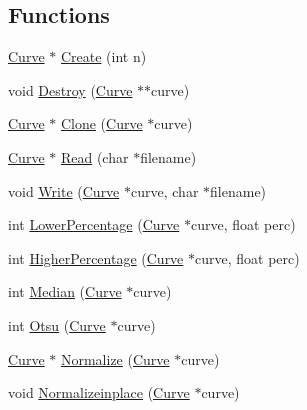 \subsection*{Functions}
\begin{DoxyCompactItemize}
\item 
\hyperlink{namespacegft_1_1Curve_acc891f63f04c17f7b2cafe7ed9ecffdb}{Curve} $\ast$ \hyperlink{namespacegft_1_1Curve_a7cf4bab7abfe8541e31da0df2573b468}{Create} (int n)
\item 
void \hyperlink{namespacegft_1_1Curve_a994c428f1902a7dddf16233227dc7ab4}{Destroy} (\hyperlink{namespacegft_1_1Curve_acc891f63f04c17f7b2cafe7ed9ecffdb}{Curve} $\ast$$\ast$curve)
\item 
\hyperlink{namespacegft_1_1Curve_acc891f63f04c17f7b2cafe7ed9ecffdb}{Curve} $\ast$ \hyperlink{namespacegft_1_1Curve_a658d7489c5c13b5acb86f1ae9a8b228c}{Clone} (\hyperlink{namespacegft_1_1Curve_acc891f63f04c17f7b2cafe7ed9ecffdb}{Curve} $\ast$curve)
\item 
\hyperlink{namespacegft_1_1Curve_acc891f63f04c17f7b2cafe7ed9ecffdb}{Curve} $\ast$ \hyperlink{namespacegft_1_1Curve_a4bdf463b529f8ab78a668d06317905ac}{Read} (char $\ast$filename)
\item 
void \hyperlink{namespacegft_1_1Curve_a5dda565b8308a573f2dbc4b6d8a1e047}{Write} (\hyperlink{namespacegft_1_1Curve_acc891f63f04c17f7b2cafe7ed9ecffdb}{Curve} $\ast$curve, char $\ast$filename)
\item 
int \hyperlink{namespacegft_1_1Curve_a49841fe44a37db11cc97b3e6487e49d4}{Lower\-Percentage} (\hyperlink{namespacegft_1_1Curve_acc891f63f04c17f7b2cafe7ed9ecffdb}{Curve} $\ast$curve, float perc)
\item 
int \hyperlink{namespacegft_1_1Curve_a2a95c7c101cbf4fbf3aaca3cf5d5d07d}{Higher\-Percentage} (\hyperlink{namespacegft_1_1Curve_acc891f63f04c17f7b2cafe7ed9ecffdb}{Curve} $\ast$curve, float perc)
\item 
int \hyperlink{namespacegft_1_1Curve_a2fddddb44752d2e51b14c00b79507ae5}{Median} (\hyperlink{namespacegft_1_1Curve_acc891f63f04c17f7b2cafe7ed9ecffdb}{Curve} $\ast$curve)
\item 
int \hyperlink{namespacegft_1_1Curve_ac62859b6ef341757478fe9b50aa3e0b6}{Otsu} (\hyperlink{namespacegft_1_1Curve_acc891f63f04c17f7b2cafe7ed9ecffdb}{Curve} $\ast$curve)
\item 
\hyperlink{namespacegft_1_1Curve_acc891f63f04c17f7b2cafe7ed9ecffdb}{Curve} $\ast$ \hyperlink{namespacegft_1_1Curve_ab346e5f010473c3f0e1f3e2b9e858800}{Normalize} (\hyperlink{namespacegft_1_1Curve_acc891f63f04c17f7b2cafe7ed9ecffdb}{Curve} $\ast$curve)
\item 
void \hyperlink{namespacegft_1_1Curve_afcaaba754ed0d39e5e31438445533c2c}{Normalizeinplace} (\hyperlink{namespacegft_1_1Curve_acc891f63f04c17f7b2cafe7ed9ecffdb}{Curve} $\ast$curve)
\end{DoxyCompactItemize}


